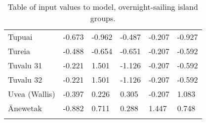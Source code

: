 \begin{longtable}{p{4.5cm}p{2cm}p{2cm}p{2cm}p{4cm}p{4cm}}
  Tupuai & -0.673 & -0.962 & -0.487 & -0.207 & -0.927 \\ 
  Tureia & -0.488 & -0.654 & -0.651 & -0.207 & -0.592 \\ 
  Tuvalu 31 & -0.221 & 1.501 & -1.126 & -0.207 & -0.592 \\ 
  Tuvalu 32 & -0.221 & 1.501 & -1.126 & -0.207 & -0.592 \\ 
  Uvea (Wallis) & -0.397 & 0.226 & 0.305 & -0.207 & 1.083 \\ 
  Ānewetak & -0.882 & 0.711 & 0.288 & 1.447 & 0.748 \\ 
   \bottomrule
\caption{Table of input values to model, overnight-sailing island groups.} 
\label{appendix_SBZR_table}
\end{longtable}
